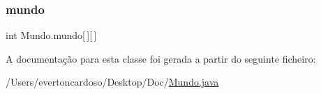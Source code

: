 \subsubsection{\texorpdfstring{mundo}{mundo}}
{\footnotesize\ttfamily int Mundo.\+mundo\mbox{[}$\,$\mbox{]}\mbox{[}$\,$\mbox{]}\hspace{0.3cm}{\ttfamily [protected]}}



A documentação para esta classe foi gerada a partir do seguinte ficheiro\+:\begin{DoxyCompactItemize}
\item 
/\+Users/evertoncardoso/\+Desktop/\+Doc/\mbox{\hyperlink{_mundo_8java}{Mundo.\+java}}\end{DoxyCompactItemize}

